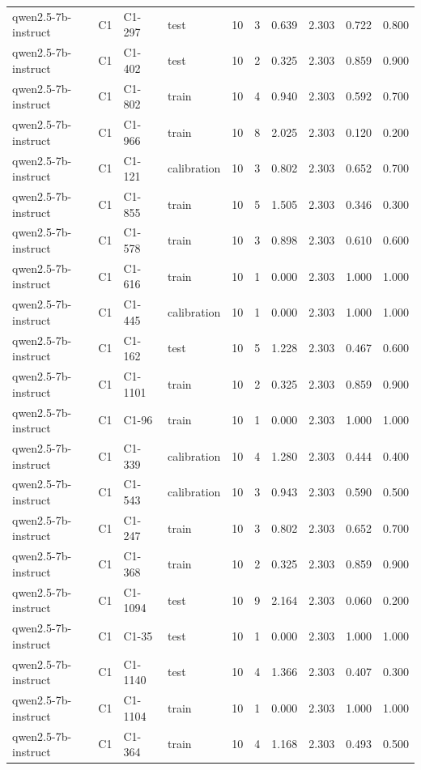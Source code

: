 \begin{table}
\begin{tabular}{llllrrrrrr}
qwen2.5-7b-instruct & C1 & C1-297 & test & 10 & 3 & 0.639 & 2.303 & 0.722 & 0.800 \\
qwen2.5-7b-instruct & C1 & C1-402 & test & 10 & 2 & 0.325 & 2.303 & 0.859 & 0.900 \\
qwen2.5-7b-instruct & C1 & C1-802 & train & 10 & 4 & 0.940 & 2.303 & 0.592 & 0.700 \\
qwen2.5-7b-instruct & C1 & C1-966 & train & 10 & 8 & 2.025 & 2.303 & 0.120 & 0.200 \\
qwen2.5-7b-instruct & C1 & C1-121 & calibration & 10 & 3 & 0.802 & 2.303 & 0.652 & 0.700 \\
qwen2.5-7b-instruct & C1 & C1-855 & train & 10 & 5 & 1.505 & 2.303 & 0.346 & 0.300 \\
qwen2.5-7b-instruct & C1 & C1-578 & train & 10 & 3 & 0.898 & 2.303 & 0.610 & 0.600 \\
qwen2.5-7b-instruct & C1 & C1-616 & train & 10 & 1 & 0.000 & 2.303 & 1.000 & 1.000 \\
qwen2.5-7b-instruct & C1 & C1-445 & calibration & 10 & 1 & 0.000 & 2.303 & 1.000 & 1.000 \\
qwen2.5-7b-instruct & C1 & C1-162 & test & 10 & 5 & 1.228 & 2.303 & 0.467 & 0.600 \\
qwen2.5-7b-instruct & C1 & C1-1101 & train & 10 & 2 & 0.325 & 2.303 & 0.859 & 0.900 \\
qwen2.5-7b-instruct & C1 & C1-96 & train & 10 & 1 & 0.000 & 2.303 & 1.000 & 1.000 \\
qwen2.5-7b-instruct & C1 & C1-339 & calibration & 10 & 4 & 1.280 & 2.303 & 0.444 & 0.400 \\
qwen2.5-7b-instruct & C1 & C1-543 & calibration & 10 & 3 & 0.943 & 2.303 & 0.590 & 0.500 \\
qwen2.5-7b-instruct & C1 & C1-247 & train & 10 & 3 & 0.802 & 2.303 & 0.652 & 0.700 \\
qwen2.5-7b-instruct & C1 & C1-368 & train & 10 & 2 & 0.325 & 2.303 & 0.859 & 0.900 \\
qwen2.5-7b-instruct & C1 & C1-1094 & test & 10 & 9 & 2.164 & 2.303 & 0.060 & 0.200 \\
qwen2.5-7b-instruct & C1 & C1-35 & test & 10 & 1 & 0.000 & 2.303 & 1.000 & 1.000 \\
qwen2.5-7b-instruct & C1 & C1-1140 & test & 10 & 4 & 1.366 & 2.303 & 0.407 & 0.300 \\
qwen2.5-7b-instruct & C1 & C1-1104 & train & 10 & 1 & 0.000 & 2.303 & 1.000 & 1.000 \\
qwen2.5-7b-instruct & C1 & C1-364 & train & 10 & 4 & 1.168 & 2.303 & 0.493 & 0.500 \\

\end{tabular}
\end{table}

